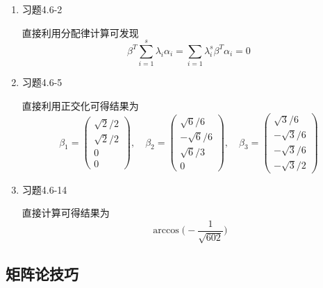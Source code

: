\documentclass[a4paper,UTF8,fontset=windows]{ctexart}
\begin{document}
\begin{enumerate}
    \item 习题4.6-2
    
    直接利用分配律计算可发现
    $$\beta^T\sum_{i=1}^s\lambda_i\alpha_i=\sum_{i=1}\lambda_i^s\beta^T\alpha_i=0$$

    \item 习题4.6-5
    
    直接利用正交化可得结果为
    $$\beta_1=\begin{pmatrix}\sqrt{2}/2\\\sqrt{2}/2\\0\\0\end{pmatrix},\quad\beta_2=\begin{pmatrix}\sqrt{6}/6\\-\sqrt{6}/6\\\sqrt{6}/3\\0\end{pmatrix},\quad\beta_3=\begin{pmatrix}\sqrt{3}/6\\-\sqrt{3}/6\\-\sqrt{3}/6\\-\sqrt{3}/2\end{pmatrix}$$
    

    \item 习题4.6-14
    
    直接计算可得结果为
    $$\arccos\bigg(-\frac{1}{\sqrt{602}}\bigg)$$

\end{enumerate}

\subsection{矩阵论技巧}
\end{document}
